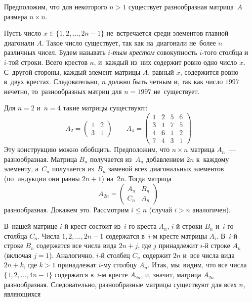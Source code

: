 \ifincludesolutions
\setcounter{jeolmsubproblem}{0}
\subproblem
Предположим, что для некоторого $n > 1$ существует разнообразная матрица~$A$
размера $n \times n$.
\par
Пусть число $x \in \{ 1, 2, \ldots, 2 n - 1 \}$ не~встречается среди элементов
главной диагонали $A$.
Такое число существует, так как на~диагонали не~более $n$ различных чисел.
Будем называть \emph{$i$-тым крестом} совокупность $i$-того столбца и~$i$-той
строки.
Всего крестов $n$, и~каждый из~них содержит ровно одно число $x$.
С~другой стороны, каждый элемент матрицы $A$, равный $x$, содержится ровно
в~двух крестах.
Следовательно, $n$ должно быть четным и, так как число $1997$ нечетно,
то~разнообразных матриц для $n = 1997$ не~существует.
\par
\subproblem
Для $n = 2$ и~$n = 4$ такие матрицы существуют:
\[
    A_2
=
    \begin{pmatrix}
        1 & 2 \\
        3 & 1
    \end{pmatrix}
\qquad
    A_4
=
    \begin{pmatrix}
        1 & 2 & 5 & 6 \\
        3 & 1 & 7 & 5 \\
        4 & 6 & 1 & 2 \\
        7 & 4 & 3 & 1
    \end{pmatrix}
\]
Эту конструкцию можно обобщить.
Предположим, что $n \times n$ матрица $A_n$~--- разнообразная.
Матрица $B_n$ получается из~$A_n$ добавлением $2 n$ к~каждому элементу, а~$C_n$
получается из~$B_n$ заменой всех диагональных элементов (по~индукции они равны
$2 n + 1$) на~$2 n$.
Тогда матрица
\[
    A_{2n}
=
    \begin{pmatrix}
        A_n & B_n \\
        C_n & A_n
    \end{pmatrix}
\]
разнообразная.
Докажем это.
Рассмотрим $i \leq n$ (случай $i > n$ аналогичен).
\par
В~нашей матрице $i$-й крест состоит из~$i$-го креста $A_n$, $i$-й
строки $B_n$ и~$i$-го столбца $C_n$.
Числа $1, 2, \ldots, 2 n - 1$ содержатся в~$i$-м кресте матрицы $A_i$.
В~$i$-й строке $B_n$ содержатся все числа вида $2 n + j$, где $j$ принадлежит
$i$-й строке $A_n$ (включая $j = 1$).
Аналогично, $i$-й столбец $C_n$ содержит $2n$ и~все числа вида $2 n + k$, где
$k > 1$ принадлежат $i$-му столбцу $A_n$.
Итак, мы~видим, что все числа $\{1, 2, \ldots, 4 n - 1\}$ содержатся в~$i$-м
кресте $A_{2n}$, и, значит, матрица $A_{2n}$ разнообразная.
Следовательно, разнообразные матрицы существуют для всех $n$, являющихся
